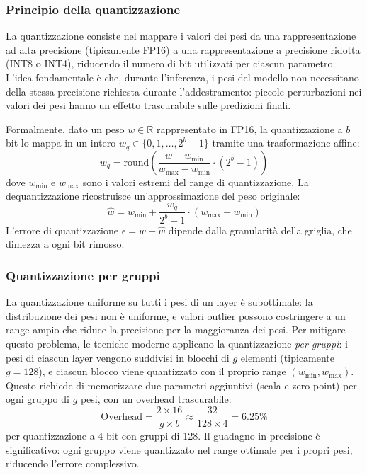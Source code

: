 \subsubsection{Principio della quantizzazione}

La quantizzazione consiste nel mappare i valori dei pesi da una rappresentazione ad alta precisione (tipicamente FP16) a una rappresentazione a precisione ridotta (INT8 o INT4), riducendo il numero di bit utilizzati per ciascun parametro. L'idea fondamentale è che, durante l'inferenza, i pesi del modello non necessitano della stessa precisione richiesta durante l'addestramento: piccole perturbazioni nei valori dei pesi hanno un effetto trascurabile sulle predizioni finali.

Formalmente, dato un peso $w \in \mathbb{R}$ rappresentato in FP16, la quantizzazione a $b$ bit lo mappa in un intero $w_q \in \{0, 1, \ldots, 2^b - 1\}$ tramite una trasformazione affine:
\begin{equation}
    w_q = \text{round}\left(\frac{w - w_{\min}}{w_{\max} - w_{\min}} \cdot (2^b - 1)\right)
\end{equation}
dove $w_{\min}$ e $w_{\max}$ sono i valori estremi del range di quantizzazione. La dequantizzazione ricostruisce un'approssimazione del peso originale:
\begin{equation}
    \hat{w} = w_{\min} + \frac{w_q}{2^b - 1} \cdot (w_{\max} - w_{\min})
\end{equation}
L'errore di quantizzazione $\epsilon = w - \hat{w}$ dipende dalla granularità della griglia, che dimezza a ogni bit rimosso.

\subsubsection{Quantizzazione per gruppi}

La quantizzazione uniforme su tutti i pesi di un layer è subottimale: la distribuzione dei pesi non è uniforme, e valori outlier possono costringere a un range ampio che riduce la precisione per la maggioranza dei pesi. Per mitigare questo problema, le tecniche moderne applicano la quantizzazione \textit{per gruppi}: i pesi di ciascun layer vengono suddivisi in blocchi di $g$ elementi (tipicamente $g = 128$), e ciascun blocco viene quantizzato con il proprio range $(w_{\min}, w_{\max})$. Questo richiede di memorizzare due parametri aggiuntivi (scala e zero-point) per ogni gruppo di $g$ pesi, con un overhead trascurabile:
\begin{equation}
    \text{Overhead} = \frac{2 \times 16}{g \times b} \approx \frac{32}{128 \times 4} = 6.25\%
\end{equation}
per quantizzazione a 4 bit con gruppi di 128. Il guadagno in precisione è significativo: ogni gruppo viene quantizzato nel range ottimale per i propri pesi, riducendo l'errore complessivo.

